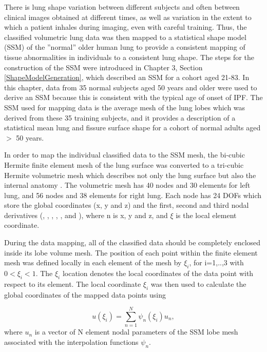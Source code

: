 There is lung shape variation between different subjects and often between clinical images obtained at different times, as well as variation in the extent to which a patient inhales during imaging, even with careful training. Thus, the classified volumetric lung data was then mapped to a statistical shape model (SSM) of the ''normal'' older human lung to provide a consistent mapping of tissue abnormalities in individuals to a consistent lung shape. The steps for the construction of the SSM were introduced in Chapter 3, Section \ref{ShapeModelGeneration}, which described an SSM for a cohort aged 21-83. In this chapter, data from 35 normal subjects aged 50 years and older were used to derive an SSM because this is consistent with the typical age of onset of IPF. The SSM used for mapping data is the average mesh of the lung lobes which was derived from these 35 training subjects, and it provides a description of a statistical mean lung and fissure surface shape for a cohort of normal adults aged $>$ 50 years.

In order to map the individual classified data to the SSM mesh, the bi-cubic Hermite finite element mesh of the lung surface was converted to a tri-cubic Hermite volumetric mesh which describes not only the lung surface but also the internal anatomy \citep{tawhai2003developing}. The volumetric mesh has 40 nodes and 30 elements for left lung, and 56 nodes and 38 elements for right lung. Each node has 24 DOFs which store the global coordinates (x, y and z) and the first, second and third nodal derivatives (, , , , ,  and ), where n is x, y and z, and $\xi$ is the local element coordinate.

During the data mapping, all of the classified data should be completely enclosed inside its lobe volume mesh. The position of each point within the finite element mesh was defined locally in each element of the mesh by $\xi_{i}$, for i=1,..,3 with $0<\xi_{i}<1$. The $\xi_{i}$ location denotes the local coordinates of the data point with respect to its element. The local coordinate $\xi_{i}$ was then used to calculate the global coordinates of the mapped data points using

\begin{equation}
u(\xi_{i}) = \sum_{n=1}^{N} \psi_n(\xi_{i})u_n,
\end{equation}
where $u_n$ is a vector of N element nodal parameters of the SSM lobe mesh associated with the interpolation functions $\psi_{n}$. 


